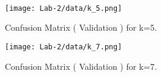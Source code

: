\FloatBarrier

\\

\begin{figure}[ht]
\centering
\texttt{[image: Lab-2/data/k\_5.png]}
\caption{Confusion Matrix ( Validation ) for k=5.}
\label{fig:sample}
\end{figure}

\FloatBarrier


\begin{figure}[ht!]
\centering
\texttt{[image: Lab-2/data/k\_7.png]}
\caption{Confusion Matrix ( Validation ) for k=7.}
\label{fig:sample}
\end{figure}
